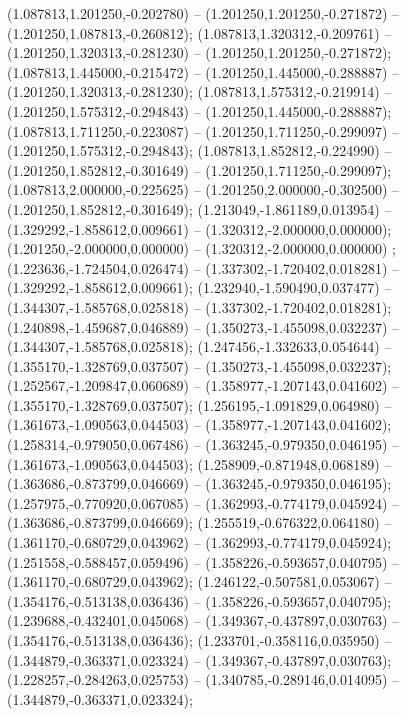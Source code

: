  (1.087813,1.201250,-0.202780) -- (1.201250,1.201250,-0.271872) -- (1.201250,1.087813,-0.260812);
 (1.087813,1.320312,-0.209761) -- (1.201250,1.320313,-0.281230) -- (1.201250,1.201250,-0.271872);
 (1.087813,1.445000,-0.215472) -- (1.201250,1.445000,-0.288887) -- (1.201250,1.320313,-0.281230);
 (1.087813,1.575312,-0.219914) -- (1.201250,1.575312,-0.294843) -- (1.201250,1.445000,-0.288887);
 (1.087813,1.711250,-0.223087) -- (1.201250,1.711250,-0.299097) -- (1.201250,1.575312,-0.294843);
 (1.087813,1.852812,-0.224990) -- (1.201250,1.852812,-0.301649) -- (1.201250,1.711250,-0.299097);
 (1.087813,2.000000,-0.225625) -- (1.201250,2.000000,-0.302500) -- (1.201250,1.852812,-0.301649);
 (1.213049,-1.861189,0.013954) -- (1.329292,-1.858612,0.009661) -- (1.320312,-2.000000,0.000000);
 (1.201250,-2.000000,0.000000) -- (1.320312,-2.000000,0.000000) ;
 (1.223636,-1.724504,0.026474) -- (1.337302,-1.720402,0.018281) -- (1.329292,-1.858612,0.009661);
 (1.232940,-1.590490,0.037477) -- (1.344307,-1.585768,0.025818) -- (1.337302,-1.720402,0.018281);
 (1.240898,-1.459687,0.046889) -- (1.350273,-1.455098,0.032237) -- (1.344307,-1.585768,0.025818);
 (1.247456,-1.332633,0.054644) -- (1.355170,-1.328769,0.037507) -- (1.350273,-1.455098,0.032237);
 (1.252567,-1.209847,0.060689) -- (1.358977,-1.207143,0.041602) -- (1.355170,-1.328769,0.037507);
 (1.256195,-1.091829,0.064980) -- (1.361673,-1.090563,0.044503) -- (1.358977,-1.207143,0.041602);
 (1.258314,-0.979050,0.067486) -- (1.363245,-0.979350,0.046195) -- (1.361673,-1.090563,0.044503);
 (1.258909,-0.871948,0.068189) -- (1.363686,-0.873799,0.046669) -- (1.363245,-0.979350,0.046195);
 (1.257975,-0.770920,0.067085) -- (1.362993,-0.774179,0.045924) -- (1.363686,-0.873799,0.046669);
 (1.255519,-0.676322,0.064180) -- (1.361170,-0.680729,0.043962) -- (1.362993,-0.774179,0.045924);
 (1.251558,-0.588457,0.059496) -- (1.358226,-0.593657,0.040795) -- (1.361170,-0.680729,0.043962);
 (1.246122,-0.507581,0.053067) -- (1.354176,-0.513138,0.036436) -- (1.358226,-0.593657,0.040795);
 (1.239688,-0.432401,0.045068) -- (1.349367,-0.437897,0.030763) -- (1.354176,-0.513138,0.036436);
 (1.233701,-0.358116,0.035950) -- (1.344879,-0.363371,0.023324) -- (1.349367,-0.437897,0.030763);
 (1.228257,-0.284263,0.025753) -- (1.340785,-0.289146,0.014095) -- (1.344879,-0.363371,0.023324);
